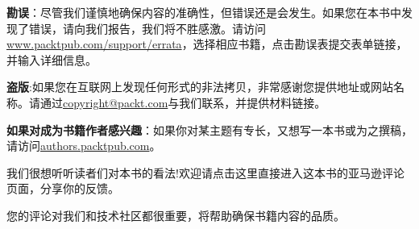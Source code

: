 \textbf{勘误}：尽管我们谨慎地确保内容的准确性，但错误还是会发生。如果您在本书中发现了错误，请向我们报告，我们将不胜感激。请访问\url{www.packtpub.com/support/errata}，选择相应书籍，点击勘误表提交表单链接，并输入详细信息。

\textbf{盗版}:如果您在互联网上发现任何形式的非法拷贝，非常感谢您提供地址或网站名称。请通过\url{copyright@packt.com}与我们联系，并提供材料链接。

\textbf{如果对成为书籍作者感兴趣}：如果你对某主题有专长，又想写一本书或为之撰稿，请访问\url{authors.packtpub.com}。



我们很想听听读者们对本书的看法!欢迎请点击这里直接进入这本书的亚马逊评论页面，分享你的反馈。

您的评论对我们和技术社区都很重要，将帮助确保书籍内容的品质。

